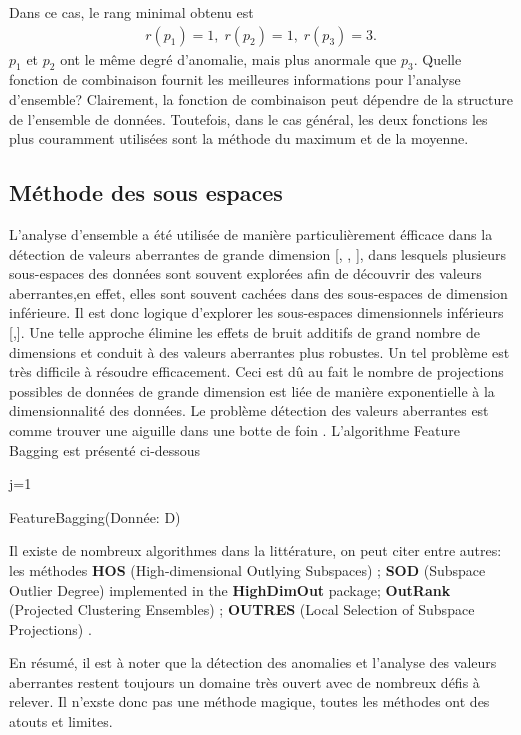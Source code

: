 Dans ce cas, le rang minimal obtenu est
\begin{align*}
r\left(p_{1}\right)=1,\; r\left(p_{2}\right)=1,\; r \left(p_{3}\right)=3.
\end{align*}
$p_1$ et $p_2$ ont le même degré d'anomalie, mais plus anormale que $p_3$. 
Quelle fonction de combinaison fournit les meilleures informations pour l'analyse d'ensemble?
Clairement, la fonction de combinaison peut dépendre de la structure de l'ensemble de données. Toutefois, dans le cas général, les deux fonctions les plus couramment utilisées sont la méthode du maximum et de la moyenne.
%
%
\subsection{Méthode des sous espaces}
%
%
L'analyse d'ensemble a été utilisée de manière particulièrement éfficace dans la détection de valeurs aberrantes de grande dimension [\cite{A8}, \cite{A13}, \cite{A14}], dans lesquels plusieurs sous-espaces des données sont souvent explorées afin de découvrir des valeurs aberrantes,en effet, elles sont souvent cachées dans des sous-espaces de dimension inférieure. Il est donc logique d'explorer les sous-espaces dimensionnels inférieurs [\cite{A1},\cite{Aurore}]. Une telle approche élimine les effets de bruit additifs de grand nombre de dimensions et conduit à des valeurs aberrantes plus robustes. Un tel problème est très difficile à résoudre efficacement. Ceci est dû au fait le nombre de projections possibles de données de grande dimension est liée de manière exponentielle à la dimensionnalité des données. Le problème détection des valeurs aberrantes est comme trouver une aiguille dans une botte de foin \cite{A14}. L'algorithme Feature Bagging est présenté ci-dessous

\begin{algorithm}
\SetAlgoLined
j=1\;
\caption{FeatureBagging(Donnée: D)}
\end{algorithm}
Il existe de nombreux algorithmes dans la littérature, on peut citer entre autres: les méthodes \textbf{HOS} (High-dimensional Outlying Subspaces) \cite{Zhang}; \textbf{SOD} (Subspace Outlier Degree) \cite{Zi} implemented in the \textbf{HighDimOut} package; \textbf{OutRank} (Projected Clustering Ensembles) \cite{M1}; \textbf{OUTRES} (Local Selection of Subspace Projections) \cite{M3}.


En résumé, il est à noter que la détection des anomalies et l'analyse des valeurs aberrantes restent toujours un domaine très ouvert avec de nombreux défis à relever. Il n'exste donc pas une méthode magique, toutes les méthodes ont des atouts et limites. 